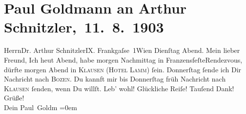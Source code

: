 

         
         \renewcommand{\erwaehntePersonen}{Personen: Paul Goldmann, Theodore Rottenberg}
         \renewcommand{\erwaehnteOrte}{Orte: Bozen, Frankgasse 1, Franzensfeste, Gasthof zum Lamm, Klausen (Südtirol), Wien}
         \renewcommand{\erwaehnteWerke}{}
               \section[ Paul Goldmann an Arthur Schnitzler, 11. 8. 1903]{ Paul Goldmann an Arthur Schnitzler, 11. 8. 1903}\nopagebreak{}\rehead{ }\begin{ledgroupsized}[t]{13cm}\normalsize\beginnumbering \toendnotes[C]{\smallbreak\pagebreak[2]} 
\toendnotes[C]{\smallbreak}\pstart{}{\pb}Herrn\pend{}\pstart{}Dr. Arthur Schnitzler\pend{}\pstart{}IX. Frankgaſse 1\pend{}\pstart{}Wien\pend{}{\bigskip}\pstart
           {\pb}Dienſtag{ }Abend.\pend
           \pstart{}Mein lieber Freund,\pend\pstart
           Ich \label{K_L03383-1v}\label{K_L03383-1h}{ }heut{ }Abend, habe morgen{ }Nachmittag in FranzensfeſteRendezvous, dürfte morgen{ }Abend in \textsc{Klausen} (\textsc{Hotel Lamm}) ſein. Donnerſtag ſende ich Dir Nachricht nach
                  \textsc{Bozen}. Du kannft mir bis Donnerſtag{ }früh Nachricht nach \textsc{Klausen} ſenden, wenn Du willſt.\pend
           \pstart
           Leb’ wohl! Glückliche Reiſe! Tauſend Dank! Grüße! {\\[\baselineskip]}Dein \spacefill\mbox{Paul
                  Goldm}\pend
           \leftskip=0em{}
         
         \endnumbering{}\end{ledgroupsized}  \newcommand{\dateiname}{L03383}\newcommand{\titel}{Paul Goldmann an Arthur Schnitzler, 11. 8. 1903}\newcommand{\editorInnen}{Martin Anton Müller und Laura Untner}
      